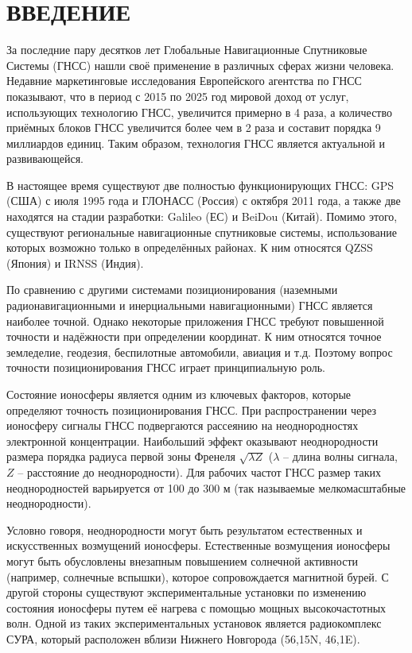 \chapter*{ВВЕДЕНИЕ}

За последние пару десятков лет Глобальные Навигационные Спутниковые Системы (ГНСС) нашли своё применение в различных сферах жизни человека.
Недавние маркетинговые исследования Европейского агентства по ГНСС \cite{EGA2017} показывают, что в период с 2015 по 2025 год мировой доход от услуг, использующих технологию ГНСС, увеличится примерно в 4 раза, а количество приёмных блоков ГНСС увеличится более чем в 2 раза и составит порядка 9 миллиардов единиц. 
Таким образом, технология ГНСС является актуальной и развивающейся.

В настоящее время существуют две полностью функционирующих ГНСС: GPS (США) с июля 1995 года и ГЛОНАСС (Россия) с октября 2011 года, а также две находятся на стадии разработки: Galileo (ЕС) и BeiDou (Китай).
Помимо этого, существуют региональные навигационные спутниковые системы, использование которых возможно только в определённых районах.
К ним относятся QZSS (Япония) и IRNSS (Индия).

По сравнению с другими системами позиционирования (наземными радионавигационными и инерциальными навигационными) ГНСС является наиболее точной.
Однако некоторые приложения ГНСС требуют повышенной точности и надёжности при определении координат.
К ним относятся точное земледелие, геодезия, беспилотные автомобили, авиация и т.д.  
Поэтому вопрос точности позиционирования ГНСС играет принципиальную роль.

Состояние ионосферы является одним из ключевых факторов, которые определяют точность позиционирования ГНСС. 
При распространении через ионосферу сигналы ГНСС подвергаются рассеянию на неоднородностях электронной концентрации. 
Наибольший эффект оказывают неоднородности размера порядка радиуса первой зоны Френеля $\sqrt{\lambda Z}$ ($\lambda$ -- длина волны сигнала, $Z$ -- расстояние до неоднородности). 
Для рабочих частот ГНСС размер таких неоднородностей варьируется от 100 до 300 м (так называемые мелкомасштабные неоднородности). 

Условно говоря, неоднородности могут быть результатом естественных и искусственных возмущений ионосферы.
Естественные возмущения ионосферы могут быть обусловлены внезапным повышением солнечной активности (например, солнечные вспышки), которое сопровождается магнитной бурей.  
С другой стороны существуют экспериментальные установки по изменению состояния ионосферы путем её нагрева с помощью мощных высокочастотных волн. 
Одной из таких экспериментальных установок является радиокомплекс СУРА, который расположен вблизи Нижнего Новгорода (56,15\degree N, 46,1\degree E).


